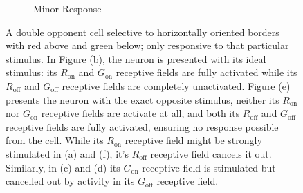 \documentclass[journal,onecolumn]{IEEEtran}
\begin{document}
\begin{figure}[h]
\begin{subfigure}{0.3\textwidth}
        \caption{Minor Response}
    \end{subfigure}
    \caption{A double opponent cell selective to horizontally oriented borders with red above and green below; only responsive to that particular stimulus. In Figure (b), the neuron is presented with its ideal stimulus: its $R_{\text{on}}$ and $G_{\text{on}}$ receptive fields are fully activated while its $R_{\text{off}}$ and $G_{\text{off}}$ receptive fields are completely unactivated. Figure (e) presents the neuron with the exact opposite stimulus, neither its $R_{\text{on}}$ nor $G_{\text{on}}$ receptive fields are activate at all, and both its $R_{\text{off}}$ and $G_{\text{off}}$ receptive fields are fully activated, ensuring no response possible from the cell. While its $R_{\text{on}}$ receptive field might be strongly stimulated in (a) and (f), it's $R_{\text{off}}$ receptive field cancels it out. Similarly, in (c) and (d) its $G_{\text{on}}$ receptive field is stimulated but cancelled out by activity in its $G_{\text{off}}$ receptive field.}
\end{figure}
\end{document}
